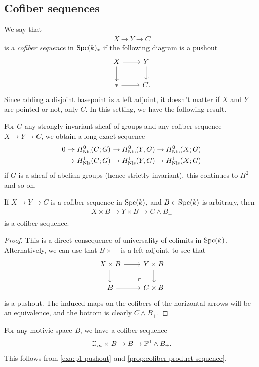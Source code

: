 \documentclass[11pt,openany]{book}
\let\smashprod\wedge
\begin{document}
\subsection{Cofiber sequences}

We say that
\begin{align*}
    X \to Y \to C
\end{align*}
is a \textit{cofiber sequence} in $\mathrm{Spc}(k)_\ast$ if the following diagram is a pushout
\[ \begin{tikzcd}
    X\rar\dar & Y\dar\\
    \ast\rar & C.
\end{tikzcd} \]
Since adding a disjoint basepoint is a left adjoint, it doesn't matter if $X$ and $Y$ are pointed or not, only $C$. In this setting, we have the following result.

\begin{proposition} For $G$ any strongly invariant sheaf of groups and any cofiber sequence $X \to Y \to C$, we obtain a long exact sequence
\begin{align*}
    0 \to H_{\mathrm{Nis}}^0(C;G) \to H^0_{\mathrm{Nis}}(Y,G) \to H^0_{\mathrm{Nis}}(X;G) \\
    \to  H_{\mathrm{Nis}}^1(C;G) \to H^1_{\mathrm{Nis}}(Y,G) \to H^1_{\mathrm{Nis}}(X;G)
\end{align*}
if $G$ is a sheaf of abelian groups (hence strictly invariant), this continues to $H^2$ and so on.
\end{proposition}

\begin{proposition}\label{prop:cofiber-product-sequence} 
If $X \to Y \to C$ is a cofiber sequence in $\mathrm{Spc}(k)$, and $B \in \mathrm{Spc}(k)$ is arbitrary, then
\begin{align*}
    X \times B \to Y \times B \to C \smashprod B_+
\end{align*}
is a cofiber sequence.
\end{proposition}
\begin{proof} This is a direct consequence of universality of colimits in $\mathrm{Spc}(k)$. Alternatively, we can use that $B \times -$ is a left adjoint, to see that
\[ \begin{tikzcd}
    X \times B\rar\dar & Y \times B\dar\\
    B\rar & C \times B\po
\end{tikzcd} \]
is a pushout. The induced maps on the cofibers of the horizontal arrows will be an equivalence, and the bottom is clearly $C \smashprod B_+$.
\end{proof}

%
\begin{example} For any motivic space $B$, we have a cofiber sequence
\begin{align*}
    \mathbb{G}_m \times B \to B \to \P^1 \smashprod B_+.
\end{align*}
This follows from \autoref{exa:p1-pushout} and \autoref{prop:cofiber-product-sequence}.
\end{example}
\end{document}
